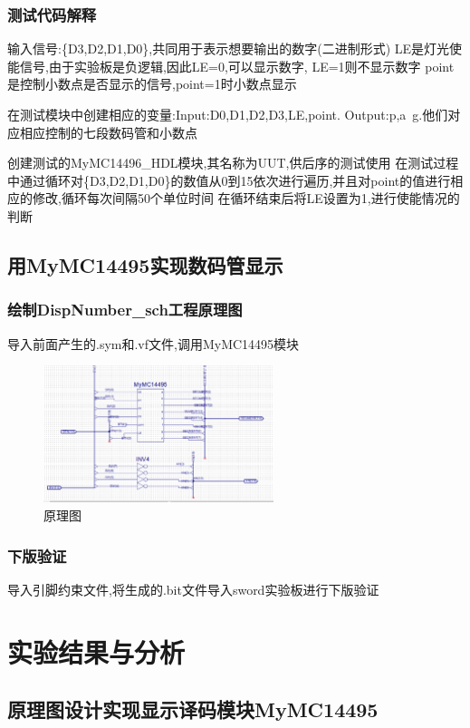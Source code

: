 \documentclass{article}
\begin{document}
\subsubsection*{测试代码解释}
输入信号:\{D3,D2,D1,D0\},共同用于表示想要输出的数字(二进制形式)
LE是灯光使能信号,由于实验板是负逻辑,因此LE=0,可以显示数字, LE=1则不显示数字
point是控制小数点是否显示的信号,point=1时小数点显示

在测试模块中创建相应的变量:Input:D0,D1,D2,D3,LE,point.
Output:p,a~g.他们对应相应控制的七段数码管和小数点

创建测试的MyMC14496\_HDL模块,其名称为UUT,供后序的测试使用
在测试过程中通过循环对\{D3,D2,D1,D0\}的数值从0到15依次进行遍历,并且对point的值进行相应的修改,循环每次间隔50个单位时间
在循环结束后将LE设置为1,进行使能情况的判断



\subsection{用MyMC14495实现数码管显示}
\subsubsection{绘制DispNumber\_sch工程原理图}
导入前面产生的.sym和.vf文件,调用MyMC14495模块
    \begin{figure}[H]
	\centering
	\includegraphics[width=0.6\textwidth]{4.png}
	\caption{\label{Lab6}原理图}
	\end{figure}

\subsubsection{下版验证}
导入引脚约束文件,将生成的.bit文件导入sword实验板进行下版验证

\section{实验结果与分析}

\subsection{原理图设计实现显示译码模块MyMC14495}
\end{document}
